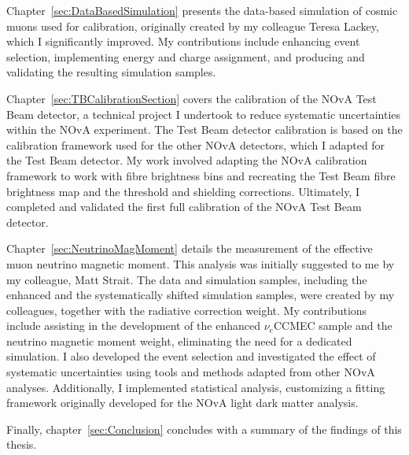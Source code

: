 Chapter~\ref{sec:DataBasedSimulation} presents the data-based simulation of cosmic muons used for calibration, originally created by my colleague Teresa Lackey, which I significantly improved. My contributions include enhancing event selection, implementing energy and charge assignment, and producing and validating the resulting simulation samples.

Chapter~\ref{sec:TBCalibrationSection} covers the calibration of the NOvA Test Beam detector, a technical project I undertook to reduce systematic uncertainties within the NOvA experiment. The Test Beam detector calibration is based on the calibration framework used for the other NOvA detectors, which I adapted for the Test Beam detector. My work involved adapting the NOvA calibration framework to work with fibre brightness bins and recreating the Test Beam fibre brightness map and the threshold and shielding corrections. Ultimately, I completed and validated the first full calibration of the NOvA Test Beam detector.

Chapter~\ref{sec:NeutrinoMagMoment} details the measurement of the effective muon neutrino magnetic moment. This analysis was initially suggested to me by my colleague, Matt Strait. The data and simulation samples, including the enhanced and the systematically shifted simulation samples, were created by my colleagues, together with the radiative correction weight. My contributions include assisting in the development of the enhanced $\nu_e$CCMEC sample and the neutrino magnetic moment weight, eliminating the need for a dedicated simulation. I also developed the event selection and investigated the effect of systematic uncertainties using tools and methods adapted from other NOvA analyses. Additionally, I implemented statistical analysis, customizing a fitting framework originally developed for the NOvA light dark matter analysis.

Finally, chapter~\ref{sec:Conclusion} concludes with a summary of the findings of this thesis.

\iffalse

